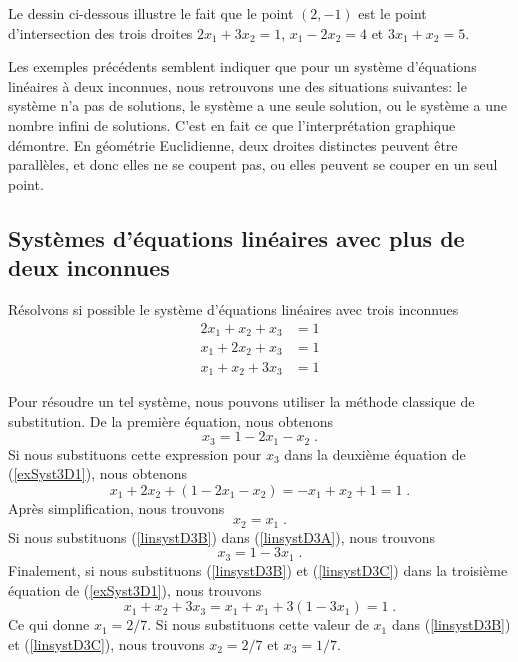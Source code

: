 {\begin{egg}

Le dessin ci-dessous illustre le fait que le point $(2,-1)$ est le
point d'intersection des trois droites $2x_1 + 3x_2 = 1$,
$x_1 - 2x_2 = 4$ et $3x_1 + x_2 = 5$.
\end{egg}

Les exemples précédents semblent indiquer que pour un système
d'équations linéaires à deux inconnues, nous retrouvons une des situations
suivantes: le système n'a pas de solutions, le système a une seule
solution, ou le système a une nombre infini de solutions.   C'est en
fait ce que l'interprétation graphique démontre.  En géométrie
Euclidienne, deux droites distinctes peuvent être parallèles, et donc
elles ne se coupent pas, ou elles peuvent se couper en un seul point.

\subsection{Systèmes d'équations linéaires avec plus de deux
 inconnues}

\begin{egg}
Résolvons si possible le système d'équations linéaires avec trois
inconnues
\begin{equation}\label{exSyst3D1}
\begin{split}
2x_1 + x_2 + x_3 &= 1\\
x_1 + 2x_2 + x_3 &= 1\\
x_1 + x_2 + 3x_3 &= 1
\end{split}
\end{equation}

Pour résoudre un tel système, nous pouvons utiliser la méthode classique de
substitution.  De la première équation, nous obtenons
\begin{equation}\label{linsystD3A}
x_3 = 1 - 2x_1 -x_2 \; .
\end{equation}
Si nous substituons cette expression pour $x_3$ dans la deuxième
équation de (\ref{exSyst3D1}),  nous obtenons
\[
x_1 + 2x_2 + (1-2x_1-x_2) = -x_1 + x_2 + 1 = 1 \; .
\]
Après simplification, nous trouvons
\begin{equation}\label{linsystD3B}
x_2=x_1 \; .
\end{equation}
Si nous substituons (\ref{linsystD3B}) dans (\ref{linsystD3A}), nous
trouvons
\begin{equation}\label{linsystD3C}
x_3 = 1 - 3x_1 \; .
\end{equation}
Finalement, si nous substituons (\ref{linsystD3B}) et
(\ref{linsystD3C}) dans la troisième équation de (\ref{exSyst3D1}),
nous trouvons
\[
x_1 + x_2 + 3x_3 = x_1 + x_1 + 3(1-3x_1) = 1 \; .
\]
Ce qui donne $x_1 = 2/7$.  Si nous substituons cette valeur de $x_1$ dans
(\ref{linsystD3B}) et (\ref{linsystD3C}), nous trouvons $x_2=2/7$ et
$x_3=1/7$.


\end{egg}}
